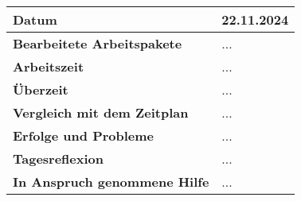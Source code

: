\begin{longtable}{p{}|p{}}
	\hline
	\textbf{Datum}                       & 22.11.2024            \\
	\hline
	\textbf{Bearbeitete Arbeitspakete}   & ...                  \\
	\hline
	\textbf{Arbeitszeit}                 & ...                                    \\
	\hline
	\textbf{Überzeit}                    & ...                                    \\
	\hline
	\textbf{Vergleich mit dem Zeitplan}  & ... \\
	\hline
	\textbf{Erfolge und Probleme} & ...
	\\
	\hline
	\textbf{Tagesreflexion} & ...
	\\
	\hline
	\textbf{In Anspruch genommene Hilfe} & ...                              \\
	\hline
\end{longtable}\label{tab:arbeitsprotokoll-22.11.2024}
\newpage
